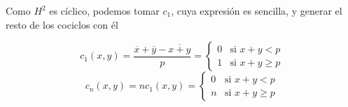 \begin{ejercicio}
\begin{solucion}
		Como $H^2$ es cíclico, podemos tomar $c_1$, cuya expresión es sencilla, y generar el resto de los cociclos con él
		
		\[
		    c_1(x,y) = \frac{\overline{x} + \overline{y} - \overline{x+y}}{p} =  \begin{cases}
		        0 & \text{si } x+y < p\\
		        1 & \text{si } x+y \geq p
		        \end{cases}
		\]
		\[
		    c_n(x,y) = nc_1(x,y) =  \begin{cases}
		        0 & \text{si } x+y < p\\
		        n & \text{si } x+y \geq p
		        \end{cases}
		\]
	\end{solucion}
\end{ejercicio}
